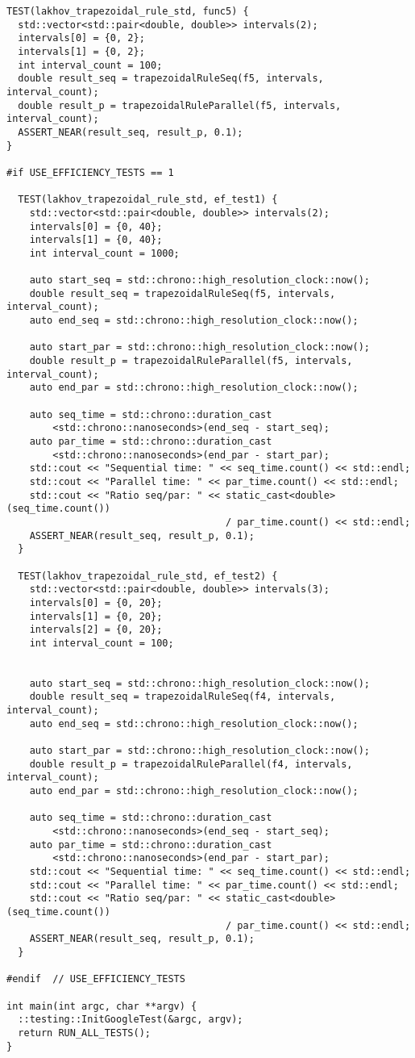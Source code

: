 \documentclass{report}
\begin{document}
\begin{lstlisting}
TEST(lakhov_trapezoidal_rule_std, func5) {
  std::vector<std::pair<double, double>> intervals(2);
  intervals[0] = {0, 2};
  intervals[1] = {0, 2};
  int interval_count = 100;
  double result_seq = trapezoidalRuleSeq(f5, intervals, interval_count);
  double result_p = trapezoidalRuleParallel(f5, intervals, interval_count);
  ASSERT_NEAR(result_seq, result_p, 0.1);
}

#if USE_EFFICIENCY_TESTS == 1

  TEST(lakhov_trapezoidal_rule_std, ef_test1) {
    std::vector<std::pair<double, double>> intervals(2);
    intervals[0] = {0, 40};
    intervals[1] = {0, 40};
    int interval_count = 1000;

    auto start_seq = std::chrono::high_resolution_clock::now();
    double result_seq = trapezoidalRuleSeq(f5, intervals, interval_count);
    auto end_seq = std::chrono::high_resolution_clock::now();

    auto start_par = std::chrono::high_resolution_clock::now();
    double result_p = trapezoidalRuleParallel(f5, intervals, interval_count);
    auto end_par = std::chrono::high_resolution_clock::now();

    auto seq_time = std::chrono::duration_cast
        <std::chrono::nanoseconds>(end_seq - start_seq);
    auto par_time = std::chrono::duration_cast
        <std::chrono::nanoseconds>(end_par - start_par);
    std::cout << "Sequential time: " << seq_time.count() << std::endl;
    std::cout << "Parallel time: " << par_time.count() << std::endl;
    std::cout << "Ratio seq/par: " << static_cast<double>(seq_time.count())
                                      / par_time.count() << std::endl;
    ASSERT_NEAR(result_seq, result_p, 0.1);
  }

  TEST(lakhov_trapezoidal_rule_std, ef_test2) {
    std::vector<std::pair<double, double>> intervals(3);
    intervals[0] = {0, 20};
    intervals[1] = {0, 20};
    intervals[2] = {0, 20};
    int interval_count = 100;


    auto start_seq = std::chrono::high_resolution_clock::now();
    double result_seq = trapezoidalRuleSeq(f4, intervals, interval_count);
    auto end_seq = std::chrono::high_resolution_clock::now();

    auto start_par = std::chrono::high_resolution_clock::now();
    double result_p = trapezoidalRuleParallel(f4, intervals, interval_count);
    auto end_par = std::chrono::high_resolution_clock::now();

    auto seq_time = std::chrono::duration_cast
        <std::chrono::nanoseconds>(end_seq - start_seq);
    auto par_time = std::chrono::duration_cast
        <std::chrono::nanoseconds>(end_par - start_par);
    std::cout << "Sequential time: " << seq_time.count() << std::endl;
    std::cout << "Parallel time: " << par_time.count() << std::endl;
    std::cout << "Ratio seq/par: " << static_cast<double>(seq_time.count())
                                      / par_time.count() << std::endl;
    ASSERT_NEAR(result_seq, result_p, 0.1);
  }

#endif  // USE_EFFICIENCY_TESTS

int main(int argc, char **argv) {
  ::testing::InitGoogleTest(&argc, argv);
  return RUN_ALL_TESTS();
}
\end{lstlisting}
\end{document}
